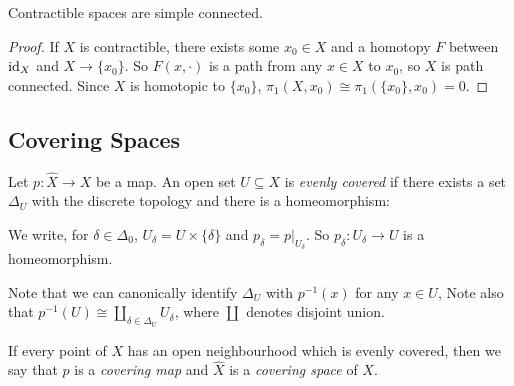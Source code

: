 \documentclass[10pt,a4paper]{article}
\begin{document}
\begin{corollary}
Contractible spaces are simple connected.
\end{corollary}
\begin{proof}
If $X$ is contractible, there exists some $x_0 \in X$ and a homotopy $F$ between $\operatorname{id}_X$ and $X \rightarrow \{x_0\}$. So $F(x, \cdot)$ is a path from any $x\in X$ to $x_0$, so $X$ is path connected. Since $X$ is homotopic to $\{x_0\}$, $\pi_1(X, x_0)\cong \pi_1(\{x_0\},x_0) = 0$.
\end{proof}

\subsection*{Covering Spaces}
Let $p:\hat{X}\rightarrow X$ be a map. An open set $U\subseteq X$ is \emph{evenly covered} if there exists a set $\Delta_U$ with the discrete topology and there is a homeomorphism:
\begin{center}
\end{center}

We write, for $\delta \in \Delta_0$, $U_\delta = U\times \{\delta\}$ and $p_\delta = p|_{U_\delta}$. So $p_\delta: U_\delta \rightarrow U$ is a homeomorphism.

Note that we can canonically identify $\Delta_U$ with $p^{-1}(x)$ for any $x\in U$, Note also that $p^{-1}(U) \cong \coprod_{\delta \in \Delta_U} U_\delta$, where $\coprod$ denotes disjoint union.

If every point of $X$ has an open neighbourhood which is evenly covered, then we say that $p$ is a \emph{covering map} and $\hat{X}$ is a \emph{covering space} of $X$.
\end{document}
